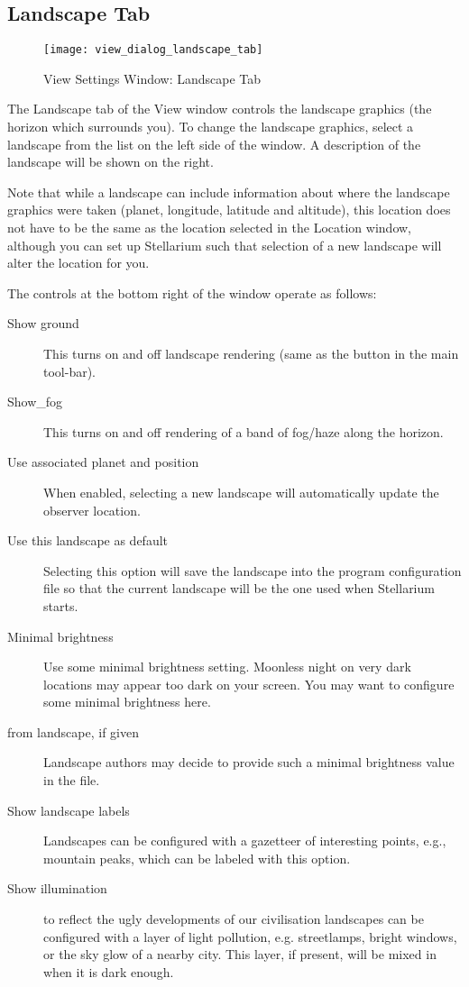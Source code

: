 \subsection{Landscape Tab}
\label{sec:gui:view:landscape}

\begin{figure}[t]
\centering\texttt{[image: view\_dialog\_landscape\_tab]}
\caption{View Settings Window: Landscape Tab}
\label{fig:gui:view:landscape}
\end{figure}

The Landscape tab of the View window controls the landscape graphics
(the horizon which surrounds you). To change the landscape graphics, select a landscape from the
list on the left side of the window. A description of the landscape will
be shown on the right.

Note that while a landscape  can include information about where the
landscape graphics were taken (planet, longitude, latitude and
altitude), this location does not have to be the same as the location
selected in the Location window, although you can set up Stellarium such
that selection of a new landscape will alter the location for you.

The controls at the bottom right of the window operate as follows:

\begin{description}
\item[Show ground] This turns on and off landscape rendering (same
  as the button  in the main tool-bar).
\item[Show\_fog] This turns on and off rendering of a band of
  fog/haze along the horizon.
\item[Use associated planet and position] When enabled, selecting a
  new landscape will automatically update the observer location.
\item[Use this landscape as default] Selecting this option will save
  the landscape into the program configuration file so that the current
  landscape will be the one used when Stellarium starts.
\item[Minimal brightness] Use some minimal brightness
  setting. Moonless night on very dark locations may appear too dark
  on your screen. You may want to configure some minimal brightness
  here.
\item[from landscape, if given] Landscape authors may decide to
  provide such a minimal brightness value in the 
  file.
\item[Show landscape labels] Landscapes can be configured with a
  gazetteer of interesting points, e.g., mountain peaks, which can be
  labeled with this option.
\item[Show illumination] to reflect the ugly developments of our
  civilisation landscapes can be configured with a layer of light
  pollution, e.g. streetlamps, bright windows, or the sky glow of a
  nearby city. This layer, if present, will be mixed in when it is
  dark enough.
\end{description}

